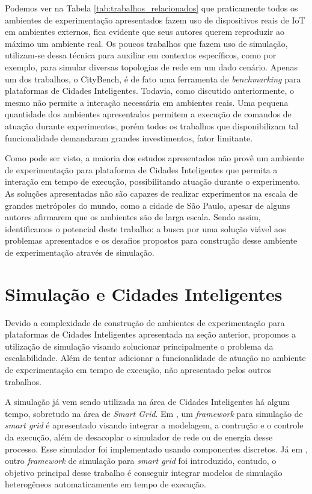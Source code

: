 Podemos ver na Tabela \ref{tab:trabalhos_relacionados} que praticamente todos os ambientes de experimentação apresentados fazem uso de dispositivos reais de IoT em ambientes externos, fica evidente que seus 
autores querem reproduzir ao máximo um ambiente real.
Os poucos trabalhos que fazem uso de simulação, utilizam-se dessa técnica para auxiliar em contextos específicos, como por exemplo, para simular diversas topologias de rede em um dado cenário.
Apenas um dos trabalhos, o CityBench, é de fato uma ferramenta de \textit{benchmarking} para plataformas de Cidades Inteligentes.
Todavia, como discutido anteriormente, o mesmo não permite a interação necessária em ambientes reais.
Uma pequena quantidade dos ambientes apresentados permitem a execução de comandos de atuação durante experimentos, porém todos os trabalhos que disponibilizam tal funcionalidade demandaram grandes
investimentos, fator limitante.

Como pode ser visto, a maioria dos estudos apresentados não provê um ambiente de experimentação para plataforma de Cidades Inteligentes que permita a interação em tempo de execução, possibilitando
atuação durante o experimento.
As soluções apresentadas não são capazes de realizar experimentos na escala de grandes metrópoles do mundo, como a cidade de São Paulo, apesar de alguns autores afirmarem que os ambientes são de
larga escala.
Sendo assim, identificamos o potencial deste trabalho: a busca por uma solução viável aos problemas apresentados e os desafios propostos para construção desse ambiente de experimentação através
de simulação.

\section{Simulação e Cidades Inteligentes}

Devido a complexidade de construção de ambientes de experimentação para plataformas de Cidades Inteligentes apresentada na seção anterior, propomos a utilização de simulação visando solucionar
principalmente o problema da escalabilidade.
Além de tentar adicionar a funcionalidade de atuação no ambiente de experimentação em tempo de execução, não apresentado pelos outros trabalhos.

A simulação já vem sendo utilizada na área de Cidades Inteligentes há algum tempo, sobretudo na área de \textit{Smart Grid}.
Em \cite{jsan_2016},  um \textit{framework} para simulação de \textit{smart grid} é apresentado visando integrar a modelagem, a contrução e o controle da execução, além de desacoplar o simulador de rede
ou de energia desse processo.
Esse simulador foi implementado usando componentes discretos.
Já em \cite{schutte_2011}, outro \textit{framework} de simulação para \textit{smart grid} foi introduzido, contudo, o objetivo principal desse trabalho é conseguir integrar modelos de simulação
heterogêneos automaticamente em tempo de execução.

